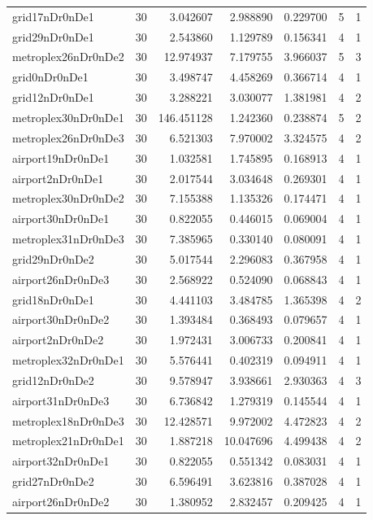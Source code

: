 \documentclass[../../../thesis.tex]{subfiles}
\begin{document}
\begin{longtable}{|l|r|r|r|r|r|r|}
grid17nDr0nDe1 & 30 & 3.042607 & 2.988890 & 0.229700 & 5 & 1 \\
grid29nDr0nDe1 & 30 & 2.543860 & 1.129789 & 0.156341 & 4 & 1 \\
metroplex26nDr0nDe2 & 30 & 12.974937 & 7.179755 & 3.966037 & 5 & 3 \\
grid0nDr0nDe1 & 30 & 3.498747 & 4.458269 & 0.366714 & 4 & 1 \\
grid12nDr0nDe1 & 30 & 3.288221 & 3.030077 & 1.381981 & 4 & 2 \\
metroplex30nDr0nDe1 & 30 & 146.451128 & 1.242360 & 0.238874 & 5 & 2 \\
metroplex26nDr0nDe3 & 30 & 6.521303 & 7.970002 & 3.324575 & 4 & 2 \\
airport19nDr0nDe1 & 30 & 1.032581 & 1.745895 & 0.168913 & 4 & 1 \\
airport2nDr0nDe1 & 30 & 2.017544 & 3.034648 & 0.269301 & 4 & 1 \\
metroplex30nDr0nDe2 & 30 & 7.155388 & 1.135326 & 0.174471 & 4 & 1 \\
airport30nDr0nDe1 & 30 & 0.822055 & 0.446015 & 0.069004 & 4 & 1 \\
metroplex31nDr0nDe3 & 30 & 7.385965 & 0.330140 & 0.080091 & 4 & 1 \\
grid29nDr0nDe2 & 30 & 5.017544 & 2.296083 & 0.367958 & 4 & 1 \\
airport26nDr0nDe3 & 30 & 2.568922 & 0.524090 & 0.068843 & 4 & 1 \\
grid18nDr0nDe1 & 30 & 4.441103 & 3.484785 & 1.365398 & 4 & 2 \\
airport30nDr0nDe2 & 30 & 1.393484 & 0.368493 & 0.079657 & 4 & 1 \\
airport2nDr0nDe2 & 30 & 1.972431 & 3.006733 & 0.200841 & 4 & 1 \\
metroplex32nDr0nDe1 & 30 & 5.576441 & 0.402319 & 0.094911 & 4 & 1 \\
grid12nDr0nDe2 & 30 & 9.578947 & 3.938661 & 2.930363 & 4 & 3 \\
airport31nDr0nDe3 & 30 & 6.736842 & 1.279319 & 0.145544 & 4 & 1 \\
metroplex18nDr0nDe3 & 30 & 12.428571 & 9.972002 & 4.472823 & 4 & 2 \\
metroplex21nDr0nDe1 & 30 & 1.887218 & 10.047696 & 4.499438 & 4 & 2 \\
airport32nDr0nDe1 & 30 & 0.822055 & 0.551342 & 0.083031 & 4 & 1 \\
grid27nDr0nDe2 & 30 & 6.596491 & 3.623816 & 0.387028 & 4 & 1 \\
airport26nDr0nDe2 & 30 & 1.380952 & 2.832457 & 0.209425 & 4 & 1 \\

\end{longtable}
\end{document}
